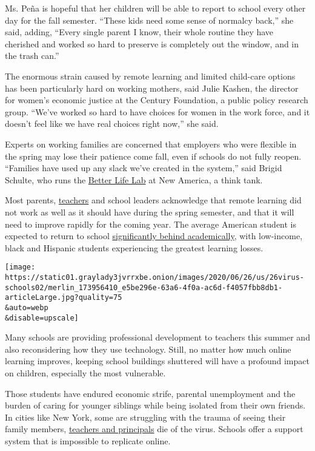 Ms. Peña is hopeful that her children will be able to report to school
every other day for the fall semester. ``These kids need some sense of
normalcy back,'' she said, adding, ``Every single parent I know, their
whole routine they have cherished and worked so hard to preserve is
completely out the window, and in the trash can.''

The enormous strain caused by remote learning and limited child-care
options has been particularly hard on working mothers, said Julie
Kashen, the director for women's economic justice at the Century
Foundation, a public policy research group. ``We've worked so hard to
have choices for women in the work force, and it doesn't feel like we
have real choices right now,'' she said.

Experts on working families are concerned that employers who were
flexible in the spring may lose their patience come fall, even if
schools do not fully reopen. ``Families have used up any slack we've
created in the system,'' said Brigid Schulte, who runs the
\href{https://www.newamerica.org/better-life-lab/}{Better Life Lab} at
New America, a think tank.

Most parents,
\href{https://www.nytimes3xbfgragh.onion/2020/07/11/us/virus-teachers-classrooms.html}{teachers}
and school leaders acknowledge that remote learning did not work as well
as it should have during the spring semester, and that it will need to
improve rapidly for the coming year. The average American student is
expected to return to school
\href{https://www.nytimes3xbfgragh.onion/2020/06/05/us/coronavirus-education-lost-learning.html}{significantly
behind academically}, with low-income, black and Hispanic students
experiencing the greatest learning losses.

\texttt{[image: https://static01.graylady3jvrrxbe.onion/images/2020/06/26/us/26virus-schools02/merlin\_173956410\_e5be296e-63a6-4f0a-ac6d-f4057fbb8db1-articleLarge.jpg?quality=75\\\&auto=webp\\\&disable=upscale]}

Many schools are providing professional development to teachers this
summer and also reconsidering how they use technology. Still, no matter
how much online learning improves, keeping school buildings shuttered
will have a profound impact on children, especially the most vulnerable.

Those students have endured economic strife, parental unemployment and
the burden of caring for younger siblings while being isolated from
their own friends. In cities like New York, some are struggling with the
trauma of seeing their family members,
\href{https://www.nytimes3xbfgragh.onion/2020/04/07/obituaries/sandra-santos-vizcaino-dead-coronavirus.html}{teachers
and principals} die of the virus. Schools offer a support system that is
impossible to replicate online.

